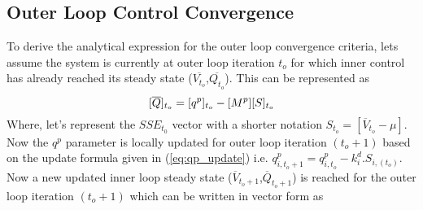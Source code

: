 \documentclass[journal]{IEEEtran}
\begin{document}
\subsection{Outer Loop Control Convergence}
To derive the analytical expression for the outer loop convergence criteria, lets assume the system is currently at outer loop iteration $t_o$ for which inner control has already reached its steady state ($\overline{V_{t_o}}$,$\overline{Q_{t_o}}$). This can be represented as
\vspace{2mm}
\begin{equation}
\small
\label{eq:outer_loop1}
{[\overline{Q}]_{t_o}}=[q^p]_{t_o}-[M^p] [S]_{t_o}
\end{equation}
Where, let's represent the $SSE_{t_0}$ vector with a shorter notation $ S_{t_o}=[\overline{V}_{t_o}-\mu]$. Now the $q^p$ parameter is locally updated for outer loop iteration $(t_o+1)$ based on the update formula given in (\ref{eq:qp_update}) i.e. $q^p_{i,{t_o+1}}=q^p_{i, t_o}-k_i^d.S_{i,(t_o)}$. Now a new updated inner loop steady state ($\overline{V}_{t_o+1}$,$\overline{Q}_{t_o+1}$) is reached for the outer loop iteration $(t_o+1)$ which can be written in vector form as
\end{document}
